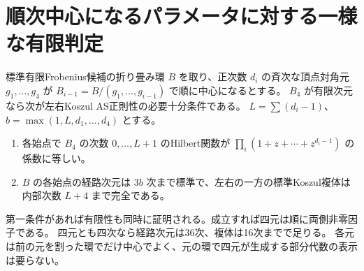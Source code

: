 \section{順次中心になるパラメータに対する一様な有限判定}
\label{sec:successively-central-cutoff}
\begin{theorem}\label{thm:successively-central-cutoff}
標準有限Frobenius候補の折り畳み環 $B$ を取り、正次数 $d_i$ の斉次な頂点対角元
$g_1,\ldots,g_4$ が $B_{i-1}=B/(g_1,\ldots,g_{i-1})$ で順に中心になるとする。
$B_4$ が有限次元なら次が左右Koszul AS正則性の必要十分条件である。
$L=\sum(d_i-1)$、$b=\max(1,L,d_1,\ldots,d_4)$ とする。
\begin{enumerate}
\item 各始点で $B_4$ の次数 $0,\ldots,L+1$ のHilbert関数が
$\prod_i(1+z+\cdots+z^{d_i-1})$ の係数に等しい。
\item $B$ の各始点の経路次元は $3b$ 次まで標準で、左右の一方の標準Koszul複体は
内部次数 $L+4$ まで完全である。
\end{enumerate}
第一条件があれば有限性も同時に証明される。成立すれば四元は順に両側非零因子である。
四元とも四次なら経路次元は36次、複体は16次までで足りる。
各元は前の元を割った環でだけ中心でよく、元の環で四元が生成する部分代数の表示は要らない。
\end{theorem}
